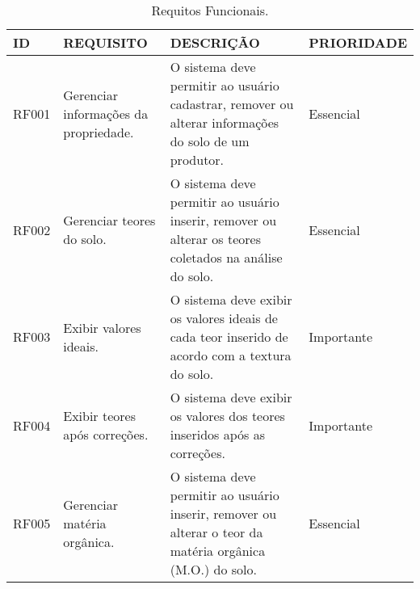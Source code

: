 

\begin{table}
\centering
\caption{Requitos Funcionais.        \label{tab:tabela-requisitos}}
\label{tab:tabela-requisitos}
\begin{tabular}{|p{2cm}|p{4cm}|p{6cm}|p{2cm}|} 
\toprule
ID    & REQUISITO                                                                        & DESCRIÇÃO                                                                                                                                                                                                                                                                                      & PRIORIDADE  \\ 
\midrule
RF001 & Gerenciar informações da propriedade.                                            & O sistema deve permitir ao usuário cadastrar, remover ou alterar informações do solo de um produtor.                                                                                                                                                                                           & Essencial   \\ 
\hline
RF002 & Gerenciar teores do solo.                                                        & O sistema deve permitir ao usuário inserir, remover ou alterar os teores coletados na análise do solo.                                                                                                                                                                                         & Essencial   \\ 
\hline
RF003 & Exibir valores ideais.                                                           & O sistema deve exibir os valores ideais de cada teor inserido de acordo com a textura do solo.                                                                                                                                                                                                 & Importante  \\ 
\hline
RF004 & Exibir teores após correções.                                                    & O sistema deve exibir os valores dos teores inseridos após as correções.                                                                                                                                                                                                                       & Importante  \\ 
\hline
RF005 & Gerenciar matéria orgânica.                                                      & O sistema deve permitir ao usuário inserir, remover ou alterar o teor da matéria orgânica (M.O.) do solo.                                                                                                                                                                                      & Essencial   \\ 

\end{tabular}
\end{table}
